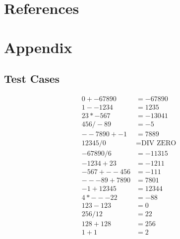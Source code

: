 \documentclass[11pt]{article}
\begin{document}
\pagebreak
\appendix
\section{References}
\printbibliography[heading=none]
\pagebreak
\section{Appendix}
\subsection{Test Cases}

\setcounter{equation}{0}
\begin{align}
    0+-67890&=-67890 \\
    1--1234&=1235\\
    23*-567&=-13041\\
    456/-89&=-5\\
    --7890+-1&=7889\\
    12345/0&=\text{DIV ZERO}\\
    -67890/6&=-11315\\
    -1234+23&=-1211\\
    -567+--456&=-111\\
    ---89+7890&=7801\\
    -1+12345&=12344\\
    4*---22&=-88\\
    123-123&=0\\
    256/12&=22\\
    128+128&=256\\
    1+1&=2
\end{align}
\end{document}
